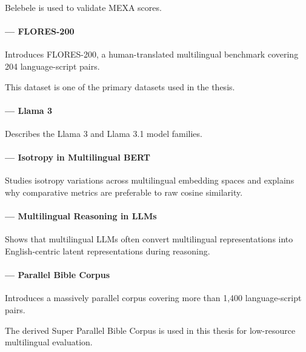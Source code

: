 \documentclass{article}
\begin{document}
Belebele is  used to validate MEXA scores.

\paragraph{\citet{nllbteam2022} --- FLORES-200}

Introduces FLORES-200, a human-translated multilingual benchmark
covering 204 language-script pairs.

This dataset is one of the primary datasets used in the thesis.

\paragraph{\citet{dubey2024llama3} --- Llama 3}

Describes the Llama 3 and Llama 3.1 model families.


\paragraph{\citet{rajaee2022isotropy} --- Isotropy in Multilingual BERT}

Studies isotropy variations across multilingual embedding spaces
and explains why comparative metrics are preferable to raw cosine similarity.

\paragraph{\citet{zhao2024multilingualism} --- Multilingual Reasoning in LLMs}

Shows that multilingual LLMs often convert multilingual representations
into English-centric latent representations during reasoning.

\paragraph{\citet{mayer2014bible} --- Parallel Bible Corpus}

Introduces a massively parallel corpus covering more than
1,400 language-script pairs.

The derived Super Parallel Bible Corpus is used in this thesis
for low-resource multilingual evaluation.



\end{document}

